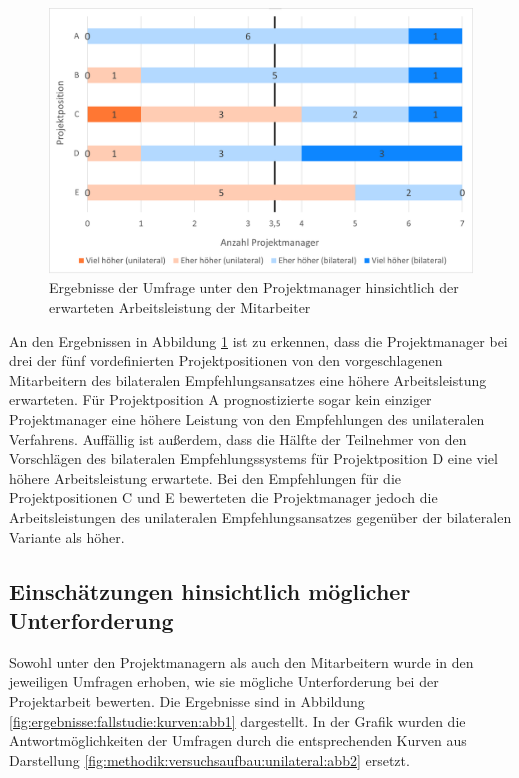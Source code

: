 \begin{figure}[h]
	\centering
	\includegraphics[width=1\textwidth]{gfx/ergebnisse-projektmanager-arbeitsleistung.png}	
	\caption{Ergebnisse der Umfrage unter den Projektmanager hinsichtlich der erwarteten Arbeitsleistung der Mitarbeiter}
	\label{fig:ergebnisse:fallstudie:arbeitsleistung:abb1}
\end{figure}

An den Ergebnissen in Abbildung \ref{fig:ergebnisse:fallstudie:arbeitsleistung:abb1} ist zu erkennen, dass die Projektmanager bei drei der fünf vordefinierten Projektpositionen von den vorgeschlagenen Mitarbeitern des bilateralen Empfehlungsansatzes eine höhere Arbeitsleistung erwarteten. Für Projektposition A prognostizierte sogar kein einziger Projektmanager eine höhere Leistung von den Empfehlungen des unilateralen Verfahrens. Auffällig ist außerdem, dass die Hälfte der Teilnehmer von den Vorschlägen des bilateralen Empfehlungssystems für Projektposition D eine viel höhere Arbeitsleistung erwartete. Bei den Empfehlungen für die Projektpositionen C und E bewerteten die Projektmanager jedoch die Arbeitsleistungen des unilateralen Empfehlungsansatzes gegenüber der bilateralen Variante als höher.
\newpage
\subsection{Einschätzungen hinsichtlich möglicher Unterforderung}
\label{ch:ergebnisse:fallstudie:kurven}
Sowohl unter den Projektmanagern als auch den Mitarbeitern wurde in den jeweiligen Umfragen erhoben, wie sie mögliche Unterforderung bei der Projektarbeit bewerten. Die Ergebnisse sind in Abbildung \ref{fig:ergebnisse:fallstudie:kurven:abb1} dargestellt. In der Grafik wurden die Antwortmöglichkeiten der Umfragen durch die entsprechenden Kurven aus Darstellung \ref{fig:methodik:versuchsaufbau:unilateral:abb2} ersetzt.

